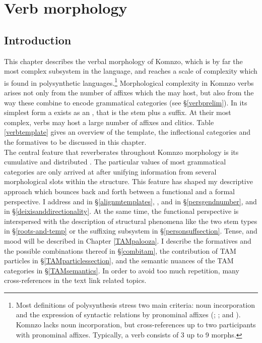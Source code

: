 
\chapter{Verb morphology} \label{cha:verb morphology}

\section{Introduction} \label{verbmorphintro}

This chapter describes the verbal morphology of Komnzo, which is by far the most complex subsystem in the language, and reaches a scale of complexity which is found in polysynthetic languages.\footnote{Most definitions of polysynthesis stress two main criteria: noun incorporation and the expression of syntactic relations by pronominal affixes (\citealt[16]{Baker:1996poly}; \citealt[2]{Evans:2002sasse}; and \citealt{Mithun:2009wh}). Komnzo lacks noun incorporation, but cross-references up to two participants with pronominal affixes. Typically, a verb consists of 3 up to 9 morphs.} Morphological complexity in Komnzo verbs arises not only from the number of affixes which the  may host, but also from the way these combine to encode grammatical categories (see \S{}\ref{verbprelim}). In its simplest form a  exists as an , that is the stem plus a  suffix. At their most complex, verbs may host a large number of affixes and clitics. Table \ref{verbtemplate} gives an overview of the  template, the inflectional categories and the formatives to be discussed in this chapter.\\

The central feature that reverberates throughout Komnzo  morphology is its cumulative and distributed . The particular values of most grammatical categories are only arrived at after unifying information from several morphological slots within the  structure. This feature has shaped my descriptive approach which bounces back and forth between a functional and a formal perspective. I address  and  in \S{}\ref{alignmtemplates}, ,  and  in \S{}\ref{persgendnumber},  and  in \S{}\ref{deixisanddirectionality}. At the same time, the functional perspective is interspersed with the description of structural phenomena like the two stem types in \S{}\ref{roots-and-temp} or the suffixing subsystem in \S{}\ref{personsuffsection}. Tense,  and mood will be described in Chapter \ref{TAMpalooza}. I describe the formatives and the possible combinations thereof in \S{}\ref{combitam}, the contribution of TAM particles in \S{}\ref{TAMparticlessection}, and the semantic nuances of the TAM categories in \S{}\ref{TAMsemantics}. In order to avoid too much repetition, many cross-references in the text link related topics.

